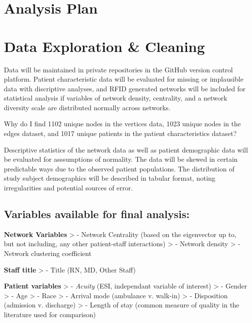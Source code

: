 \documentclass[]{elsarticle} %
\begin{document}
\section{Analysis Plan}\label{analysis-plan}

\section{Data Exploration \& Cleaning}\label{data-exploration-cleaning}

Data will be maintained in private repositories in the GitHub version
control platform. Patient characteristic data will be evaluated for
missing or implausible data with discriptive analyses, and RFID
generated networks will be included for statistical analysis if
variables of network density, centrality, and a network diversity scale
are distributed normally across networks.

Why do I find 1102 unique nodes in the vertices data, 1023 unique nodes
in the edges dataset, and 1017 unique patients in the patient
characteristics dataset?

Descriptive statistics of the network data as well as patient
demographic data will be evaluated for asssumptions of normality. The
data will be skewed in certain predictable ways due to the observed
patient populations. The distribution of study subject demographics will
be described in tabular format, noting irregularities and potential
sources of error.

\subsection{Variables available for final
analysis:}\label{variables-available-for-final-analysis}

\textbf{Network Variables} \textgreater{} - Network Centrality (based on
the eigenvector up to, but not including, any other patient-staff
interactions) \textgreater{} - Network density \textgreater{} - Network
clustering coefficient

\textbf{Staff title} \textgreater{} - Title (RN, MD, Other Staff)

\textbf{Patient variables} \textgreater{} - \emph{Acuity} (ESI,
independant variable of interest) \textgreater{} - Gender \textgreater{}
- Age \textgreater{} - Race \textgreater{} - Arrival mode (ambulance v.
walk-in) \textgreater{} - Disposition (admission v. discharge)
\textgreater{} - Length of stay (common measure of quality in the
literature used for comparison)
\end{document}
